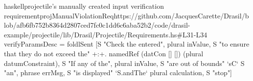 \begin{codeSnippet}{haskell}{\acs{projectile}'s manually created input verification requirement}{projManualViolationReq}{https://github.com/JacquesCarette/Drasil/blob/afb6fb752b8364d2807ced7fc0c1dd6c6aba52b2/code/drasil-example/projectile/lib/Drasil/Projectile/Requirements.hs\#L31-L34}
verifyParamsDesc = foldlSent [S "Check the entered", plural inValue,
    S "to ensure that they do not exceed the" +:+. namedRef (datCon [] []) (plural datumConstraint),
    S "If any of the", plural inValue, S "are out of bounds" `sC`
    S "an", phrase errMsg, S "is displayed" `S.andThe` plural calculation, S "stop"]
\end{codeSnippet}
